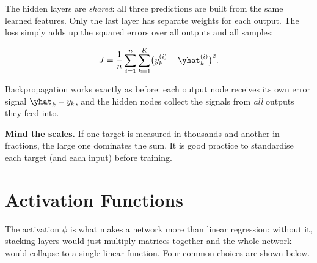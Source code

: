\documentclass[12pt, a4paper]{article}
\begin{document}
The hidden layers are \emph{shared}: all three predictions are built from the
same learned features. Only the last layer has separate weights for each
output. The loss simply adds up the squared errors over all outputs and all
samples:
\begin{resultbox}
  \[
    J = \frac{1}{n} \sum_{i=1}^{n} \sum_{k=1}^{K}
    \bigl(y^{(i)}_k - \yhat^{(i)}_k\bigr)^2 .
  \]
\end{resultbox}
Backpropagation works exactly as before: each output node receives its own
error signal $\yhat_k - y_k$, and the hidden nodes collect the signals from
\emph{all} outputs they feed into.

\begin{notebox}
  \textbf{Mind the scales.} If one target is measured in thousands and
  another in fractions, the large one dominates the sum. It is good practice
  to standardise each target (and each input) before training.
\end{notebox}

\section{Activation Functions}
\label{sec:activation}

The activation $\phi$ is what makes a network more than linear regression:
without it, stacking layers would just multiply matrices together and the
whole network would collapse to a single linear function. Four common choices
are shown below.

\newcommand{\actaxes}[4]{%
  \draw[gray!40, ->] (#1,0) -- (#2+0.3,0) node[right, font=\scriptsize, gray] {$z$};
  \draw[gray!40, ->] (0,#3) -- (0,#4+0.3);
}
\end{document}

